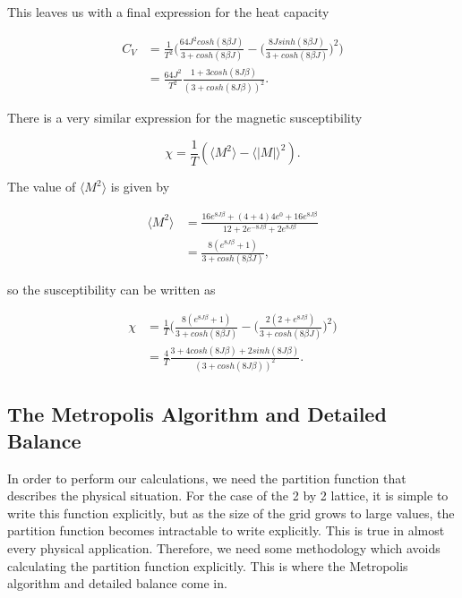 \documentclass[%
oneside,                 %
final,                   %
10pt]{article}
\begin{document}
This leaves us with a final expression for the heat capacity

\begin{equation*}
\begin{split}
C_V & =\frac{1}{T^2} \Big( \frac{64 J^2 cosh(8 \beta J)}{3 + cosh(8 \beta J)}-  \Big(\frac{8 J sinh(8 \beta J)}{3 + cosh(8 \beta J)}\Big)^2 \Big) \\
&=\frac{64 J^2}{T^2}  \frac{1+3 cosh(8J \beta)}{(3 + cosh(8J \beta))^2}.
\end{split}
\end{equation*}

There is a very similar expression for the magnetic susceptibility 

\begin{equation*}
\chi=\frac{1}{T} (\langle M^2 \rangle - \langle |M| \rangle ^2).
\end{equation*}

The value of $\langle M^2 \rangle$ is given by

\begin{equation*}
\begin{split}
\langle M^2 \rangle & = \frac{16 e^{8 J \beta}+(4+4)4e^0 +16 e^{8 J \beta}}{12+2e^{-8 J \beta} + 2e^{8 J \beta}} \\
& = \frac{8(e^{8J\beta}+1)}{3 + cosh(8 \beta J)},
\end{split}
\end{equation*}

so the susceptibility can be written as 

\begin{equation*}
\begin{split}
\chi & =\frac{1}{T} \Big( \frac{8(e^{8J\beta}+1)}{3 + cosh(8 \beta J)} -  \Big(\frac{2(2+e^{8 J \beta})}{3 + cosh(8 \beta J)}\Big)^2 \Big) \\
&=\frac{4}{T}  \frac{3+4 cosh(8J \beta) + 2 sinh(8 J \beta)}{(3 + cosh(8J \beta))^2}.
\end{split}
\end{equation*}

\subsection{The Metropolis Algorithm and Detailed Balance}

In order to perform our calculations, we need the partition function that describes the physical situation.  For the case of the 2 by 2 lattice, it is simple to write this function explicitly, but as the size of the grid grows to large values, the partition function becomes intractable to write explicitly.  This is true in almost every physical application. Therefore, we need some methodology which avoids calculating the partition function explicitly.  This is where the Metropolis algorithm and detailed balance come in.
\end{document}
